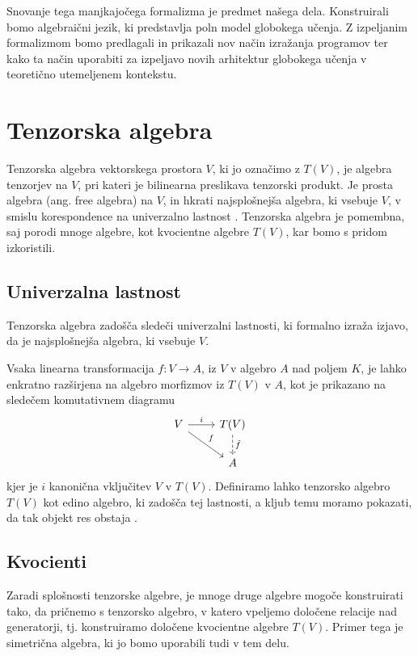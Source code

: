 \documentclass[a4paper, 12pt]{book}
\begin{document}
Snovanje tega manjkajočega formalizma je predmet našega dela. Konstruirali bomo algebraični jezik, ki predstavlja poln model globokega učenja. Z izpeljanim formalizmom bomo predlagali in prikazali nov način izražanja programov ter kako ta način uporabiti za izpeljavo novih arhitektur globokega učenja v teoretično utemeljenem kontekstu.

\section{Tenzorska algebra}\label{sec:tenAlg}

Tenzorska algebra vektorskega prostora $V$, ki jo označimo z $T(V)$, je algebra tenzorjev na $V$, pri kateri je bilinearna preslikava tenzorski produkt. Je prosta algebra (ang. free algebra) na $V$, in hkrati najsplošnejša algebra, ki vsebuje $V$, v smislu korespondence na univerzalno lastnost \cite{tenCalc1}.
Tenzorska algebra je pomembna, saj porodi mnoge algebre, kot kvocientne algebre $T(V)$, kar bomo s pridom izkoristili.

\subsection{Univerzalna lastnost}

Tenzorska algebra zadošča sledeči univerzalni lastnosti, ki formalno izraža izjavo, da je najsplošnejša algebra, ki vsebuje $V$.

Vsaka linearna transformacija $f:V\to A$, iz $V$ v algebro $A$ nad poljem $K$, je lahko enkratno razširjena na algebro morfizmov iz $T(V)$ v $A$, kot je prikazano na sledečem komutativnem diagramu
\begin{equation*}
\begin{tikzcd}
V \arrow{r}{i}  \arrow{rd}{f} 
  & T(V) \arrow[dashed]{d}{\tilde{f}} \\
    & A
\end{tikzcd}
\end{equation*}
kjer je $i$ kanonična vključitev $V$ v $T(V)$. Definiramo lahko tenzorsko algebro $T(V)$ kot edino algebro, ki zadošča tej lastnosti, a kljub temu moramo pokazati, da tak objekt res obstaja \cite{tenCalc2}.

\subsection{Kvocienti}

Zaradi splošnosti tenzorske algebre, je mnoge druge algebre mogoče konstruirati tako, da pričnemo s tenzorsko algebro, v katero vpeljemo določene relacije nad generatorji, tj. konstruiramo določene kvocientne algebre $T(V)$. Primer tega je simetrična algebra, ki jo bomo uporabili tudi v tem delu.
\end{document}
